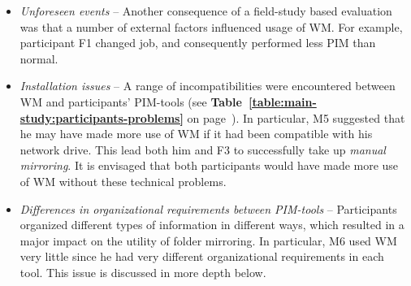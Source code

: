 \begin{itemize}
\item \textit{Unforeseen events} -- Another consequence of a field-study based evaluation was that a number of external factors influenced usage of WM. For example, participant F1 changed job, and consequently performed less PIM than normal.


\item \textit{Installation issues} -- A range of incompatibilities were encountered between WM and participants' PIM-tools (see \textbf{Table~\ref{table:main-study:participants-problems}} on page~\pageref{table:main-study:participants-problems}).  In particular, M5 suggested that he may have made more use of WM if it had been compatible with his network drive.  This lead both him and F3 to successfully take up \textit{manual mirroring}.  It is envisaged that both participants would have made more use of WM without these technical problems.

\item \textit{Differences in organizational requirements between PIM-tools} -- Participants organized different types of information in different ways, which resulted in a major impact on the utility of folder mirroring.  In particular, M6 used WM very little since he had very different organizational requirements in each tool. This issue is discussed in more depth below.

\end{itemize}


